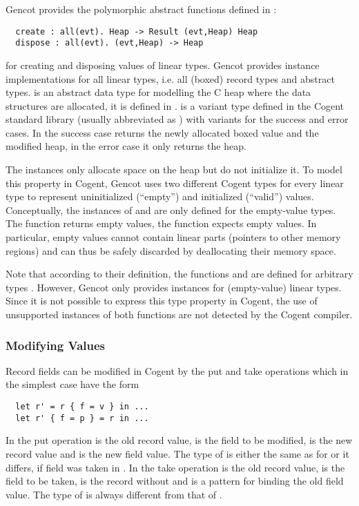 Gencot provides the polymorphic abstract functions defined in :
\begin{verbatim}
  create : all(evt). Heap -> Result (evt,Heap) Heap
  dispose : all(evt). (evt,Heap) -> Heap
\end{verbatim}
for creating and disposing values of linear types. Gencot provides instance implementations for all linear
types, i.e. all (boxed) record types and abstract types.  is an abstract data type for modelling
the C heap where the data structures are allocated, it is defined in .
 is a variant type defined in the Cogent standard library (usually abbreviated as )
with variants for the success and error cases. In the success case  returns the newly allocated 
boxed value and the modified heap, in the error case it only returns the heap.

The  instances only allocate space on the heap but do not initialize it. To model this property in 
Cogent, Gencot uses two different Cogent types for every linear type to represent uninitialized (``empty'') and 
initialized (``valid'') values.
Conceptually, the instances of  and  are only defined for the empty-value types.
The function  returns empty values, the function  expects empty values. In particular,
empty values cannot contain linear parts (pointers to other memory regions) and can thus be safely discarded by 
deallocating their memory space. 

Note that according to their definition, the functions  and  are defined for arbitrary
types . However, Gencot only provides instances for (empty-value) linear types. Since it is not possible
to express this type property in Cogent, the use of unsupported instances of both functions are not detected by the 
Cogent compiler.

\subsubsection{Modifying Values}

Record fields can be modified in Cogent by the put and take operations which in the simplest case have the form
\begin{verbatim}
  let r' = r { f = v } in ...
  let r' { f = p } = r in ...
\end{verbatim}
In the put operation  is the old record value,  is the field to be modified,  is the 
new record value and  is the new field value. The type of  is either the same as for  or it
differs, if field  was taken in . In the take operation  is the old record value,  
is the field to be taken,  is the record without  and  is a pattern for binding the old 
field value. The type of  is always different from that of .


